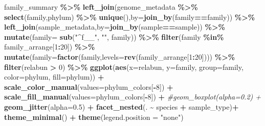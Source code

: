 \documentclass[
]{book}
\newenvironment{Shaded}{\begin{snugshade}}{\end{snugshade}}
\newcommand{\AttributeTok}[1]{\textcolor[rgb]{0.13,0.29,0.53}{#1}}
\newcommand{\CommentTok}[1]{\textcolor[rgb]{0.56,0.35,0.01}{\textit{#1}}}
\newcommand{\DecValTok}[1]{\textcolor[rgb]{0.00,0.00,0.81}{#1}}
\newcommand{\FloatTok}[1]{\textcolor[rgb]{0.00,0.00,0.81}{#1}}
\newcommand{\FunctionTok}[1]{\textcolor[rgb]{0.13,0.29,0.53}{\textbf{#1}}}
\newcommand{\NormalTok}[1]{#1}
\newcommand{\SpecialCharTok}[1]{\textcolor[rgb]{0.81,0.36,0.00}{\textbf{#1}}}
\newcommand{\StringTok}[1]{\textcolor[rgb]{0.31,0.60,0.02}{#1}}
\begin{document}
\begin{Shaded}
\begin{Highlighting}[]
\NormalTok{family\_summary }\SpecialCharTok{\%\textgreater{}\%}
    \FunctionTok{left\_join}\NormalTok{(genome\_metadata }\SpecialCharTok{\%\textgreater{}\%} \FunctionTok{select}\NormalTok{(family,phylum) }\SpecialCharTok{\%\textgreater{}\%} \FunctionTok{unique}\NormalTok{(),}\AttributeTok{by=}\FunctionTok{join\_by}\NormalTok{(family}\SpecialCharTok{==}\NormalTok{family)) }\SpecialCharTok{\%\textgreater{}\%}
    \FunctionTok{left\_join}\NormalTok{(sample\_metadata,}\AttributeTok{by=}\FunctionTok{join\_by}\NormalTok{(sample}\SpecialCharTok{==}\NormalTok{sample)) }\SpecialCharTok{\%\textgreater{}\%}
    \FunctionTok{mutate}\NormalTok{(}\AttributeTok{family=} \FunctionTok{sub}\NormalTok{(}\StringTok{"\^{}f\_\_"}\NormalTok{, }\StringTok{""}\NormalTok{, family)) }\SpecialCharTok{\%\textgreater{}\%}
    \FunctionTok{filter}\NormalTok{(family }\SpecialCharTok{\%in\%}\NormalTok{ family\_arrange[}\DecValTok{1}\SpecialCharTok{:}\DecValTok{20}\NormalTok{]) }\SpecialCharTok{\%\textgreater{}\%}
    \FunctionTok{mutate}\NormalTok{(}\AttributeTok{family=}\FunctionTok{factor}\NormalTok{(family,}\AttributeTok{levels=}\FunctionTok{rev}\NormalTok{(family\_arrange[}\DecValTok{1}\SpecialCharTok{:}\DecValTok{20}\NormalTok{]))) }\SpecialCharTok{\%\textgreater{}\%}
    \FunctionTok{filter}\NormalTok{(relabun }\SpecialCharTok{\textgreater{}} \DecValTok{0}\NormalTok{) }\SpecialCharTok{\%\textgreater{}\%}
    \FunctionTok{ggplot}\NormalTok{(}\FunctionTok{aes}\NormalTok{(}\AttributeTok{x=}\NormalTok{relabun, }\AttributeTok{y=}\NormalTok{family, }\AttributeTok{group=}\NormalTok{family, }\AttributeTok{color=}\NormalTok{phylum, }\AttributeTok{fill=}\NormalTok{phylum)) }\SpecialCharTok{+}
        \FunctionTok{scale\_color\_manual}\NormalTok{(}\AttributeTok{values=}\NormalTok{phylum\_colors[}\SpecialCharTok{{-}}\DecValTok{8}\NormalTok{]) }\SpecialCharTok{+}
        \FunctionTok{scale\_fill\_manual}\NormalTok{(}\AttributeTok{values=}\NormalTok{phylum\_colors[}\SpecialCharTok{{-}}\DecValTok{8}\NormalTok{]) }\SpecialCharTok{+}
        \CommentTok{\#geom\_boxplot(alpha=0.2) +}
        \FunctionTok{geom\_jitter}\NormalTok{(}\AttributeTok{alpha=}\FloatTok{0.5}\NormalTok{) }\SpecialCharTok{+} 
        \FunctionTok{facet\_nested}\NormalTok{(. }\SpecialCharTok{\textasciitilde{}}\NormalTok{ species }\SpecialCharTok{+}\NormalTok{ sample\_type)}\SpecialCharTok{+}
        \FunctionTok{theme\_minimal}\NormalTok{() }\SpecialCharTok{+}
        \FunctionTok{theme}\NormalTok{(}\AttributeTok{legend.position =} \StringTok{"none"}\NormalTok{)}
\end{Highlighting}
\end{Shaded}
\end{document}
